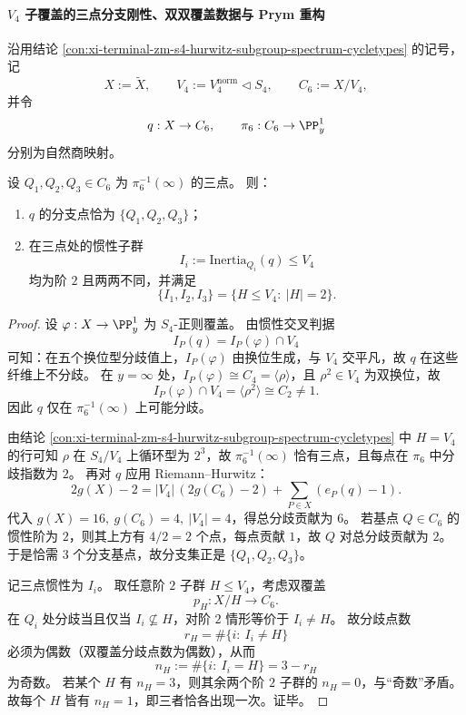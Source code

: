 \paragraph{\texorpdfstring{$V_4$}{V4} 子覆盖的三点分支刚性、双双覆盖数据与 Prym 重构}
沿用结论 \ref{con:xi-terminal-zm-s4-hurwitz-subgroup-spectrum-cycletypes} 的记号，
记
\[
X:=\widetilde X,\qquad V_4:=V_4^{\mathrm{norm}}\triangleleft S_4,\qquad
C_6:=X/V_4,
\]
并令
\[
q:X\to C_6,\qquad \pi_6:C_6\to \PP^1_y
\]
分别为自然商映射。

\begin{theorem}\label{thm:xi-v4-subcover-branch-rigidity-inertia-distinct}
设 \(Q_1,Q_2,Q_3\in C_6\) 为 \(\pi_6^{-1}(\infty)\) 的三点。
则：
\begin{enumerate}
  \item \(q\) 的分支点恰为 \(\{Q_1,Q_2,Q_3\}\)；
  \item 在三点处的惯性子群
  \[
  I_i:=\mathrm{Inertia}_{Q_i}(q)\le V_4
  \]
  均为阶 \(2\) 且两两不同，并满足
  \[
  \{I_1,I_2,I_3\}=\{H\le V_4:\ |H|=2\}.
  \]
\end{enumerate}
\end{theorem}
\begin{proof}
设 \(\varphi:X\to \PP^1_y\) 为 \(S_4\)-正则覆盖。
由惯性交叉判据
\[
I_P(q)=I_P(\varphi)\cap V_4
\]
可知：在五个换位型分歧值上，\(I_P(\varphi)\) 由换位生成，与 \(V_4\) 交平凡，故 \(q\) 在这些纤维上不分歧。
在 \(y=\infty\) 处，\(I_P(\varphi)\cong C_4=\langle\rho\rangle\)，且 \(\rho^2\in V_4\) 为双换位，故
\[
I_P(\varphi)\cap V_4=\langle \rho^2\rangle\cong C_2\neq 1.
\]
因此 \(q\) 仅在 \(\pi_6^{-1}(\infty)\) 上可能分歧。
\par
由结论 \ref{con:xi-terminal-zm-s4-hurwitz-subgroup-spectrum-cycletypes} 中 \(H=V_4\) 的行可知 \(\rho\) 在 \(S_4/V_4\) 上循环型为 \(2^3\)，故 \(\pi_6^{-1}(\infty)\) 恰有三点，且每点在 \(\pi_6\) 中分歧指数为 \(2\)。
再对 \(q\) 应用 Riemann--Hurwitz：
\[
2g(X)-2=|V_4|\,(2g(C_6)-2)+\sum_{P\in X}(e_P(q)-1).
\]
代入 \(g(X)=16,\ g(C_6)=4,\ |V_4|=4\)，得总分歧贡献为 \(6\)。
若基点 \(Q\in C_6\) 的惯性阶为 \(2\)，则其上方有 \(4/2=2\) 个点，每点贡献 \(1\)，故 \(Q\) 对总分歧贡献为 \(2\)。
于是恰需 \(3\) 个分支基点，故分支集正是 \(\{Q_1,Q_2,Q_3\}\)。
\par
记三点惯性为 \(I_i\)。
取任意阶 \(2\) 子群 \(H\le V_4\)，考虑双覆盖
\[
p_H:X/H\to C_6.
\]
在 \(Q_i\) 处分歧当且仅当 \(I_i\not\subseteq H\)，对阶 \(2\) 情形等价于 \(I_i\neq H\)。
故分歧点数
\[
r_H=\#\{i:\ I_i\neq H\}
\]
必须为偶数（双覆盖分歧点数为偶数），从而
\[
n_H:=\#\{i:\ I_i=H\}=3-r_H
\]
为奇数。
若某个 \(H\) 有 \(n_H=3\)，则其余两个阶 \(2\) 子群的 \(n_H=0\)，与“奇数”矛盾。
故每个 \(H\) 皆有 \(n_H=1\)，即三者恰各出现一次。证毕。
\end{proof}

